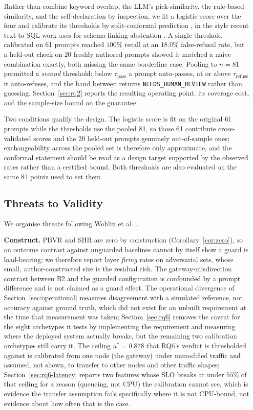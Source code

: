 \documentclass[journal, 10pt]{IEEEtran}
\begin{document}
Rather than combine keyword overlap, the LLM's pick-similarity, the rule-based
similarity, and the self-declaration by inspection, we fit a logistic score over
the four and calibrate its thresholds by split-conformal prediction
\cite{angelopoulos2023conformal}, in the style recent text-to-SQL work uses for
schema-linking abstention \cite{chen2025rts}. A single threshold calibrated on 61
prompts reached $100\%$ recall at an $18.0\%$ false-refusal rate, but a held-out
check on 20 freshly authored prompts showed it matched a naive combination
exactly, both missing the same borderline case. Pooling to $n{=}81$ permitted a
\emph{second} threshold: below
$\tau_{\text{pass}}$ a prompt auto-passes, at or above $\tau_{\text{refuse}}$ it
auto-refuses, and the band between returns \texttt{NEEDS\_HUMAN\_REVIEW} rather
than guessing. Section~\ref{sec:rq2} reports the resulting operating point, its
coverage cost, and the sample-size bound on the guarantee.

Two conditions qualify the design. The logistic score is fit on the original 61
prompts while the thresholds use the pooled 81, so those 61 contribute
cross-validated scores and the 20 held-out prompts genuinely out-of-sample ones;
exchangeability across the pooled set is therefore only approximate, and the
conformal statement should be read as a design target supported by the observed
rates rather than a certified bound. Both thresholds are also evaluated on the
same 81 points used to set them.


\subsection{Threats to Validity}
\label{sec:threats}
We organise threats following Wohlin et al.\ \cite{wohlin2012experimentation}.

\textbf{Construct.} PBVR and SHR are zero by construction
(Corollary~\ref{cor:zero}), so an outcome contrast against unguarded baselines
cannot by itself show a guard is load-bearing; we therefore report layer
\emph{firing} rates on adversarial sets, whose small, author-constructed size is
the residual risk. The gateway-misdirection contrast between B2 and the guarded
configuration is confounded by a prompt difference and is not claimed as a guard
effect. The operational divergence of Section~\ref{sec:operational} measures
disagreement with a simulated reference, not accuracy against ground truth, which
did not exist for an unbuilt requirement at the time that measurement was taken;
Section~\ref{sec:rq6} removes the caveat for the eight archetypes it tests by
implementing the requirement and measuring where the deployed system actually
breaks, but the remaining two calibration archetypes still carry it. The
ceiling $u^{*}=0.878$ that RQ6's verdict is thresholded against is calibrated
from one node (the gateway) under unmodified traffic and assumed, not shown, to
transfer to other nodes and other traffic shapes; Section~\ref{sec:rq6-latency}
reports two features whose SLO breaks at under $55\%$ of that ceiling for a
reason (queueing, not CPU) the calibration cannot see, which is evidence the
transfer assumption fails specifically where it is not CPU-bound, not evidence
about how often that is the case.
\end{document}
